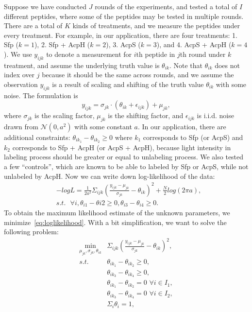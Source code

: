 Suppose we have conducted $J$ rounds of the experiments, and tested a total of $I$ different peptides, where some of the peptides may be tested in multiple
rounds. There are a total of $K$ kinds of treatments, and we measure the peptides under every treatment. For example, in our application, there are four
treatments: 1. Sfp ($k=1$), 2. Sfp + AcpH ($k=2$), 3. AcpS ($k=3$), and 4. AcpS + AcpH ($k=4$). We use $y_{ijk}$ to denote a measurement for $i$th peptide in $j$th round under $k$ treatment,
and assume the underlying truth value is $\theta_{ik}$. Note that $\theta_{ik}$ does not index over $j$ because it should be the same across rounds, and we
assume the observation $y_{ijk}$ is a result of scaling and shifting of the truth value $\theta_{ik}$ with some noise. The formulation is
\begin{equation*}
  y_{ijk} = \sigma_{jk} \cdot (\theta_{ik} + \epsilon_{ijk}) + \mu_{jk},
\end{equation*}
where $\sigma_{jk}$ is the scaling factor, $\mu_{jk}$ is the shifting factor, and $\epsilon_{ijk}$ is i.i.d. noise drawn from $\mathcal{N}(0, a^2)$ with some
constant $a$. In our application, there are additional constraints: $\theta_{ik_1} - \theta_{ik_2} \geq 0$ where $k_1$ corresponds to Sfp (or AcpS) and $k_2$
corresponds to Sfp + AcpH (or AcpS + AcpH), because light intensity in labeling process should be greater or equal to unlabeling process. We also tested a few
``controls'', which are known to be able to labeled by Sfp or AcpS, while not unlabeled by AcpH. Now we can write down log-likelihood of the data:
\begin{equation}
  \begin{split}
    &-logL = \frac{1}{2a^2} \Sigma_{ijk} (\frac{y_{ijk} - \mu_{jk}}{\sigma_{jk}} - \theta_{ik})^2 + \frac{N}{2} log(2\pi a), \\
    &s.t. \,\,\,\, \forall i, \theta_{i1} - \theta{i2} \geq 0, \theta_{i3} - \theta_{i4} \geq 0.
  \end{split}
  \label{eq:loglikelihood}
\end{equation}
To obtain the maximum likelihood estimate of the unknown parameters, we minimize~\eqref{eq:loglikelihood}. With a bit simplification, we want to solve the
following problem:
\begin{equation*}
  \begin{split}
    \underset{\mu_{jk}, \sigma_{jk}, \theta_{ik}}{\min} & \Sigma_{ijk} (\frac{y_{ijk} - \mu_{jk}}{\sigma_{jk}} - \theta_{ik})^2,\\
    s.t. \,\,\,\, & \theta_{ik_1} - \theta_{ik_2} \geq 0,\\
    & \theta_{ik_3} - \theta_{ik_4} \geq 0, \\
    & \theta_{ik_1} - \theta_{ik_2} = 0 \,\,\forall i \in I_1,\\
    & \theta_{ik_3} - \theta_{ik_4} = 0 \,\,\forall i \in I_2, \\
    & \Sigma_i \theta_i = 1,\\
  \end{split}
\end{equation*}
